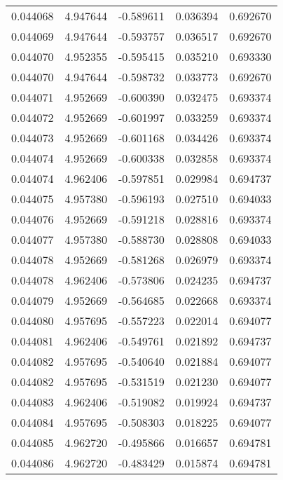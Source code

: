\begin{tabular}{lrrrr}
0.044068    &  4.947644 & -0.589611 &  0.036394 &             0.692670 \\
0.044069    &  4.947644 & -0.593757 &  0.036517 &             0.692670 \\
0.044070    &  4.952355 & -0.595415 &  0.035210 &             0.693330 \\
0.044070    &  4.947644 & -0.598732 &  0.033773 &             0.692670 \\
0.044071    &  4.952669 & -0.600390 &  0.032475 &             0.693374 \\
0.044072    &  4.952669 & -0.601997 &  0.033259 &             0.693374 \\
0.044073    &  4.952669 & -0.601168 &  0.034426 &             0.693374 \\
0.044074    &  4.952669 & -0.600338 &  0.032858 &             0.693374 \\
0.044074    &  4.962406 & -0.597851 &  0.029984 &             0.694737 \\
0.044075    &  4.957380 & -0.596193 &  0.027510 &             0.694033 \\
0.044076    &  4.952669 & -0.591218 &  0.028816 &             0.693374 \\
0.044077    &  4.957380 & -0.588730 &  0.028808 &             0.694033 \\
0.044078    &  4.952669 & -0.581268 &  0.026979 &             0.693374 \\
0.044078    &  4.962406 & -0.573806 &  0.024235 &             0.694737 \\
0.044079    &  4.952669 & -0.564685 &  0.022668 &             0.693374 \\
0.044080    &  4.957695 & -0.557223 &  0.022014 &             0.694077 \\
0.044081    &  4.962406 & -0.549761 &  0.021892 &             0.694737 \\
0.044082    &  4.957695 & -0.540640 &  0.021884 &             0.694077 \\
0.044082    &  4.957695 & -0.531519 &  0.021230 &             0.694077 \\
0.044083    &  4.962406 & -0.519082 &  0.019924 &             0.694737 \\
0.044084    &  4.957695 & -0.508303 &  0.018225 &             0.694077 \\
0.044085    &  4.962720 & -0.495866 &  0.016657 &             0.694781 \\
0.044086    &  4.962720 & -0.483429 &  0.015874 &             0.694781 \\

\end{tabular}
